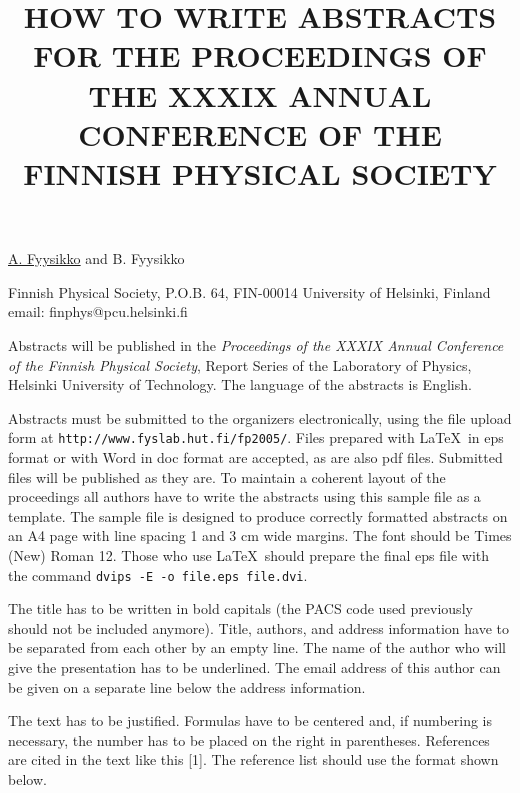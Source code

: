 \documentclass[12pt]{article}
\begin{document}
\title{HOW TO WRITE ABSTRACTS FOR THE PROCEEDINGS OF THE XXXIX ANNUAL CONFERENCE
OF THE FINNISH PHYSICAL SOCIETY}

\underline{A. Fyysikko} and B. Fyysikko

Finnish Physical Society, P.O.B. 64, FIN-00014 University of Helsinki, Finland\\
email: finphys@pcu.helsinki.fi

\vspace{\baselineskip}


Abstracts will be published in the \emph{Proceedings of the XXXIX Annual
Conference of the Finnish Physical Society}, Report Series of the
Laboratory of Physics, Helsinki University of Technology.
The language of the abstracts is English.

Abstracts must be submitted to the organizers electronically, using
the file upload form at {\tt http://www.fyslab.hut.fi/fp2005/}.
Files prepared with \LaTeX\ in eps format or with Word in doc format
are accepted, as are also pdf files.
Submitted files will be published as they are. To maintain a coherent layout of
the proceedings all authors have to write the abstracts using this sample file
as a template.
The sample file is designed to produce correctly
formatted abstracts on an A4 page with line spacing 1 and 3 cm wide margins.
The font should be Times (New) Roman 12.
Those who use \LaTeX\ should prepare the final eps
file with the command \mbox{\tt dvips -E -o file.eps file.dvi}.

The title has to be written in bold capitals (the PACS code used previously
should not be included anymore). Title, authors, and address information have
to be separated from each other by an empty line. The name of the author
who will give the presentation has to be underlined. 
The email address of this author can be given on a separate line
below the address information.

The text has to be justified. Formulas have to be centered and, if numbering is
necessary, the number has to be placed on the right in parentheses.
References are cited in the text like this [1].
The reference list should use the format shown below.

\end{document}
